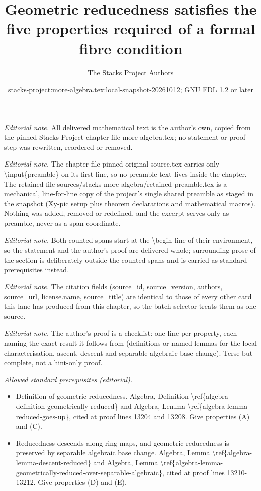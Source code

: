 \documentclass[10pt,a4paper]{amsart}
\title{Geometric reducedness satisfies the five properties required of a formal fibre condition}
\author{The Stacks Project Authors}
\date{stacks-project:more-algebra.tex:local-snapshot-20261012; GNU FDL 1.2 or later}
\theoremstyle{plain}
\theoremstyle{definition}
\theoremstyle{remark}
\numberwithin{equation}{subsection}
\begin{document}
\maketitle
\setcounter{subsection}{1}
\noindent\textit{Editorial note.} All delivered mathematical text is the author's own, copied from the pinned Stacks Project chapter file more-algebra.tex; no statement or proof step was rewritten, reordered or removed.\par\medskip
\noindent\textit{Editorial note.} The chapter file pinned-original-source.tex carries only \textbackslash{}input\{preamble\} on its first line, so no preamble text lives inside the chapter. The retained file sources/stacks-more-algebra/retained-preamble.tex is a mechanical, line-for-line copy of the project's single shared preamble as staged in the snapshot (Xy-pic setup plus theorem declarations and mathematical macros). Nothing was added, removed or redefined, and the excerpt serves only as preamble, never as a span coordinate.\par\medskip
\noindent\textit{Editorial note.} Both counted spans start at the \textbackslash{}begin line of their environment, so the statement and the author's proof are delivered whole; surrounding prose of the section is deliberately outside the counted spans and is carried as standard prerequisites instead.\par\medskip
\noindent\textit{Editorial note.} The citation fields (source\_id, source\_version, authors, source\_url, license.name, source\_title) are identical to those of every other card this lane has produced from this chapter, so the batch selector treats them as one source.\par\medskip
\noindent\textit{Editorial note.} The author's proof is a checklist: one line per property, each naming the exact result it follows from (definitions or named lemmas for the local characterisation, ascent, descent and separable algebraic base change). Terse but complete, not a hint-only proof.\par\medskip
\noindent\textit{Allowed standard prerequisites (editorial).}\begin{itemize}
\item Definition of geometric reducedness. Algebra, Definition \textbackslash{}ref\{algebra-definition-geometrically-reduced\} and Algebra, Lemma \textbackslash{}ref\{algebra-lemma-reduced-goes-up\}, cited at proof lines 13204 and 13208. Give properties (A) and (C).
\item Reducedness descends along ring maps, and geometric reducedness is preserved by separable algebraic base change. Algebra, Lemma \textbackslash{}ref\{algebra-lemma-descent-reduced\} and Algebra, Lemma \textbackslash{}ref\{algebra-lemma-geometrically-reduced-over-separable-algebraic\}, cited at proof lines 13210-13212. Give properties (D) and (E).
\end{itemize}\medskip
\end{document}
